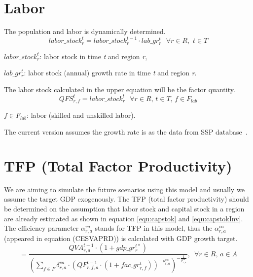 \documentclass[10pt,a4paper,titlepage,dvipdfmx]{book}
\begin{document}
\section{\label{sec:Lab}Labor}

The population and labor is dynamically determined. 
\begin{equation}
\label{equ:LabSto}
labor\_ stock_{r}^{t}=labor\_ stock_{r}^{t-1}\cdot lab\_ gr_{r}^{t}\,\,\,\,\forall r\in R,\,\,t\in T
\end{equation}
\begin{flushleft}
$labor\_ stock_{r}^{t}$: labor stock in time \textit{t} and region \textit{r},

$lab\_ gr_{r}^{t}$: labor stock (annual) growth rate in time \textit{t} and region \textit{r}.
\end{flushleft}

The labor stock calculated in the upper equation will be the factor quantity. 
\begin{equation}
\label{equ:QFS}
QFS_{r,f}^{t}=labor\_ stock_{r}^{t}\,\,\,\,\forall r\in R,\,t\in T,\,f\in F_{lab}
\end{equation}
\begin{flushleft} $f\in F_{lab}$: labor (skilled and unskilled labor). \end{flushleft}

The current version assumes the growth rate is as the data from SSP database~\cite{RN2762}.

\section{\label{sec:TFP}TFP (Total Factor Productivity)}

We are aiming to simulate the future scenarios using this model and usually we assume the target GDP exogenously. The TFP (total factor productivity) should be determined on the assumption that labor stock and capital stock in a region are already estimated as shown in equation \ref{equ:capstok} and \ref{equ:capstokInv}. The efficiency parameter $\alpha _{r,a}^{va}$ stands for TFP in this model, thus the $\alpha _{r,a}^{va}$ (appeared in equation (CESVAPRD)) is calculated with GDP growth target.
\begin{equation}
\label{equ:TFP}
=\frac{QVA_{r,a}^{t-1}\cdot \left(1+gdp\_ gr_{r}^{t*}\right)}{\left(\sum _{f\in F}\delta _{r,a}^{va}\cdot \left(QF_{r,f,a}^{t-1}\cdot \left(1+fac\_ gr_{r,f}^{t}\right)\right)^{-\rho _{r,a}^{va}}\right)^{-\frac{1}{\rho _{r,a}^{va}}}},\,\,\,\forall r\in R,\,a\in A
\end{equation}
\end{document}
